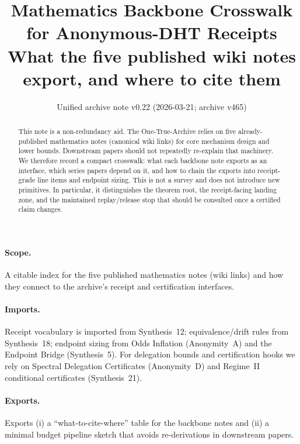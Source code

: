 \documentclass[11pt]{article}
\title{Mathematics Backbone Crosswalk for Anonymous-DHT Receipts\\
\large What the five published wiki notes export, and where to cite them}
\author{}
\date{Unified archive note v0.22 (2026-03-21; archive v465)}
\begin{document}
\maketitle

\begin{abstract}
This note is a non-redundancy aid.
The One-True-Archive relies on five already-published mathematics notes (canonical wiki links) for core mechanism design and lower bounds.
Downstream papers should not repeatedly re-explain that machinery.
We therefore record a compact crosswalk: what each backbone note exports as an interface, which series papers depend on it, and how to chain the exports into receipt-grade line items and endpoint sizing.
This is not a survey and does not introduce new primitives.
In particular, it distinguishes the theorem root, the receipt-facing landing zone, and the maintained replay/release stop that should be consulted once a certified claim changes.
\end{abstract}

\paragraph{Scope.}
A citable index for the five published mathematics notes (wiki links) and how they connect to the archive's receipt and certification interfaces.

\paragraph{Imports.}
Receipt vocabulary is imported from Synthesis~12; equivalence/drift rules from Synthesis~18; endpoint sizing from Odds Inflation (Anonymity~A) and the Endpoint Bridge (Synthesis~5).
For delegation bounds and certification hooks we rely on Spectral Delegation Certificates (Anonymity~D) and Regime~II conditional certificates (Synthesis~21).\cite{series:receiptitems,series:planstateequiv,series:oddsinflation,series:endpointbridge,series:spectral2budget,series:condcert}

\paragraph{Exports.}
Exports (i) a ``what-to-cite-where'' table for the backbone notes and (ii) a minimal budget pipeline sketch that avoids re-derivations in downstream papers.
\end{document}
